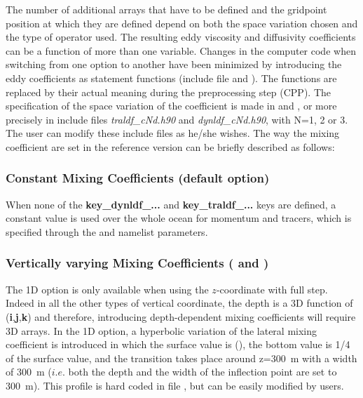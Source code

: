 The number of additional arrays that have to be defined and the gridpoint 
position at which they are defined depend on both the space variation chosen 
and the type of operator used. The resulting eddy viscosity and diffusivity 
coefficients can be a function of more than one variable. Changes in the 
computer code when switching from one option to another have been 
minimized by introducing the eddy coefficients as statement functions
(include file  and ). The functions 
are replaced by their actual meaning during the preprocessing step (CPP). 
The specification of the space variation of the coefficient is made in 
 and , or more precisely in include files 
\textit{traldf\_cNd.h90} and \textit{dynldf\_cNd.h90}, with N=1, 2 or 3. 
The user can modify these include files as he/she wishes. The way the 
mixing coefficient are set in the reference version can be briefly described 
as follows:

\subsubsection{Constant Mixing Coefficients (default option)}
When none of the \textbf{key\_dynldf\_...} and \textbf{key\_traldf\_...} keys are 
defined, a constant value is used over the whole ocean for momentum and 
tracers, which is specified through the  and  namelist 
parameters.

\subsubsection{Vertically varying Mixing Coefficients ( and )} 
The 1D option is only available when using the $z$-coordinate with full step. 
Indeed in all the other types of vertical coordinate, the depth is a 3D function 
of (\textbf{i},\textbf{j},\textbf{k}) and therefore, introducing depth-dependent 
mixing coefficients will require 3D arrays. In the 1D option, a hyperbolic variation 
of the lateral mixing coefficient is introduced in which the surface value is 
 (), the bottom value is 1/4 of the surface value, 
and the transition takes place around z=300~m with a width of 300~m 
($i.e.$ both the depth and the width of the inflection point are set to 300~m). 
This profile is hard coded in file , but can be easily modified by users.

